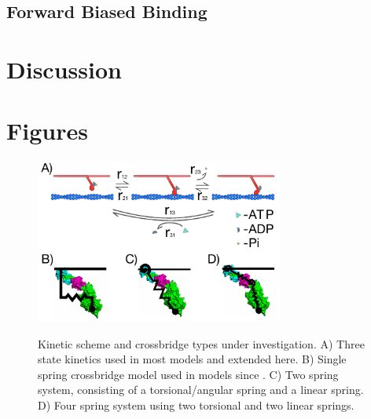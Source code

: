 \documentclass[]{article}
\begin{document}
\subsection*{Forward Biased Binding}



\section*{Discussion} %
\label{sec:discussion}



\section*{Figures} %
\label{sec:figures}

\begin{figure}[p]
    \begin{center}
    \includegraphics[width=3.2in]{../imgs/Figure1.pdf}
    \label{fig:types}
    \caption{
        Kinetic scheme and crossbridge types under investigation. 
        A) Three state kinetics used in most models and extended here. 
        B) Single spring crossbridge model used in models since \cite{Huxley1957e}. 
        C) Two spring system, consisting of a torsional/angular spring and a linear spring. 
        D) Four spring system using two torsional and two linear springs.}
    \end{center}
\end{figure}
\end{document}
